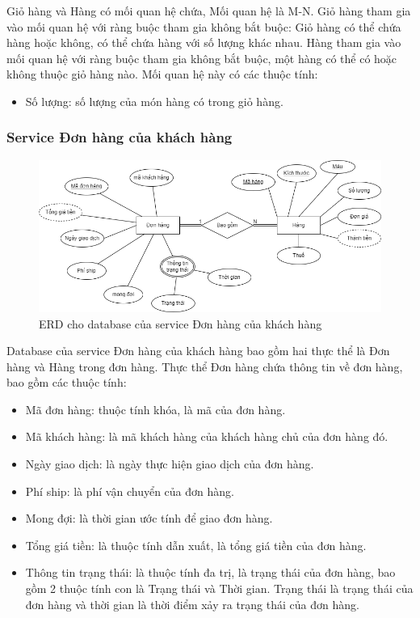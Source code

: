 \par Giỏ hàng và Hàng có mối quan hệ chứa, Mối quan hệ là M-N. Giỏ hàng tham gia vào mối quan hệ với ràng buộc tham gia không bắt buộc: Giỏ hàng có thể chứa hàng hoặc không, có thể chứa hàng với số lượng khác nhau. Hàng tham gia vào mối quan hệ với ràng buộc tham gia không bắt buộc, một hàng có thể có hoặc không thuộc giỏ hàng nào. Mối quan hệ này có các thuộc tính:
\begin{itemize}
    \item Số lượng: số lượng của món hàng có trong giỏ hàng.
\end{itemize}

\subsubsection{Service Đơn hàng của khách hàng}
\begin{figure}[!htp]
    \begin{center}
        \includegraphics[width=1\textwidth]{img/database/erd/eerd-customer-order.png}
        \newline
        \caption{ERD cho database của service Đơn hàng của khách hàng}
    \end{center}
\end{figure}

\par Database của service Đơn hàng của khách hàng bao gồm hai thực thể là Đơn hàng và Hàng trong đơn hàng. Thực thể Đơn hàng chứa thông tin về đơn hàng, bao gồm các thuộc tính:
\begin{itemize}
    \item Mã đơn hàng: thuộc tính khóa, là mã của đơn hàng.
    \item Mã khách hàng: là mã khách hàng của khách hàng chủ của đơn hàng đó.
    \item Ngày giao dịch: là ngày thực hiện giao dịch của đơn hàng.
    \item Phí ship: là phí vận chuyển của đơn hàng.
    \item Mong đợi: là thời gian ước tính để giao đơn hàng.
    \item Tổng giá tiền: là thuộc tính dẫn xuất, là tổng giá tiền của đơn hàng.
    \item Thông tin trạng thái: là thuộc tính đa trị, là trạng thái của đơn hàng, bao gồm 2 thuộc tính con là Trạng thái và Thời gian. Trạng thái là trạng thái của đơn hàng và thời gian là thời điểm xảy ra trạng thái của đơn hàng.
\end{itemize}

